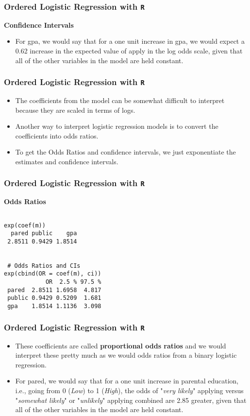 \documentclass[00-GLMregslides.tex]{subfiles}
\begin{document}
\begin{frame}
		\frametitle{Ordered Logistic Regression with \texttt{R} }
		\Large
\textbf{Confidence Intervals}
\begin{itemize}
\item For gpa, we would say that for a one unit increase in gpa, we would expect a 0.62 increase in the expected value of 
apply in the log odds scale, given that all of the other variables in the model are held constant.
\end{itemize}
\end{frame}
\begin{frame}
		\frametitle{Ordered Logistic Regression with \texttt{R} }
	\Large
\begin{itemize}
\item  The coefficients from the model can be somewhat difficult to interpret because they are scaled in terms of logs. 
\item Another way to interpret logistic regression models is to convert the coefficients into odds ratios. 
\item To get the Odds Ratios and confidence intervals, we just exponentiate the estimates and confidence intervals.
\end{itemize}
\end{frame}
\begin{frame}[fragile]
		\frametitle{Ordered Logistic Regression with \texttt{R} }
		\large
\textbf{Odds Ratios}
	\begin{verbatim}

exp(coef(m))
  pared public    gpa 
 2.8511 0.9429 1.8514
 
 
 # Odds Ratios and CIs
exp(cbind(OR = coef(m), ci))
            OR  2.5 % 97.5 %
 pared  2.8511 1.6958  4.817
 public 0.9429 0.5209  1.681
 gpa    1.8514 1.1136  3.098
\end{verbatim}
\end{frame}
\begin{frame}
		\frametitle{Ordered Logistic Regression with \texttt{R} }
		\Large
\begin{itemize}
\item These coefficients are called \textbf{proportional odds ratios} and we would interpret these pretty much as 
we would odds ratios from a binary logistic regression. 
\item For pared, we would say that for a one unit increase in parental education, i.e., going from 0 (\textit{Low}) to 1 (\textit{High}), 
the odds of "\textit{very likely}" applying versus "\textit{somewhat likely}" or "\textit{unlikely}" applying combined are 2.85 greater, 
given that all of the other variables in the model are held constant. 
\end{itemize}
\end{frame}
\end{document}
